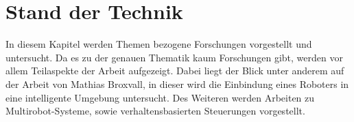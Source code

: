 \section{Stand der Technik}
\label{sec:relatedwork}

In diesem Kapitel werden Themen bezogene Forschungen vorgestellt und untersucht. Da es zu der genauen Thematik kaum Forschungen gibt, werden vor allem Teilaspekte der Arbeit aufgezeigt. Dabei liegt der Blick unter anderem auf der Arbeit von Mathias Broxvall, in dieser wird die Einbindung eines Roboters in eine intelligente Umgebung untersucht. Des Weiteren werden Arbeiten zu Multirobot-Systeme, sowie verhaltensbasierten Steuerungen vorgestellt. 




